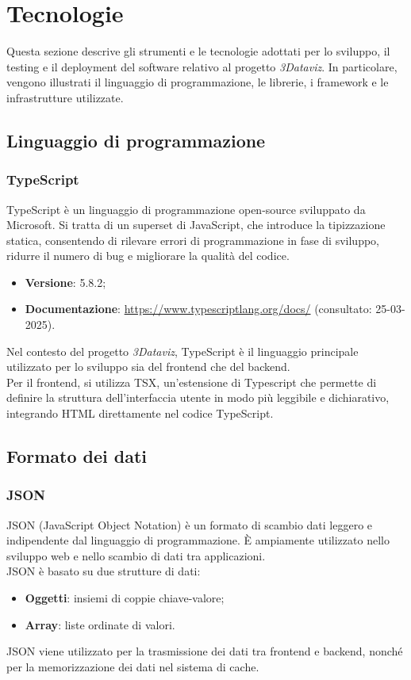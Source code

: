 \section{Tecnologie}
Questa sezione descrive gli strumenti e le tecnologie adottati per lo sviluppo,
il testing e il deployment del software relativo al progetto \textit{3Dataviz}.
In particolare, vengono illustrati il linguaggio di programmazione, le
librerie, i framework e le infrastrutture utilizzate.

\subsection{Linguaggio di programmazione}
\subsubsection{TypeScript}
TypeScript è un linguaggio di programmazione open-source sviluppato da
Microsoft. Si tratta di un superset di JavaScript, che introduce la
tipizzazione statica, consentendo di rilevare errori di programmazione in fase
di sviluppo, ridurre il numero di bug e migliorare la qualità del codice.
\begin{itemize}
    \item \textbf{Versione}: 5.8.2;
    \item \textbf{Documentazione}: \url{https://www.typescriptlang.org/docs/} (consultato:
          25-03-2025).
\end{itemize}
Nel contesto del progetto \textit{3Dataviz}, TypeScript è il linguaggio principale
utilizzato per lo sviluppo sia del frontend che del backend. \\Per il frontend,
si utilizza TSX, un'estensione di Typescript che permette di definire la struttura
dell'interfaccia utente in modo più leggibile e dichiarativo, integrando HTML
direttamente nel codice TypeScript.

\subsection{Formato dei dati}
\subsubsection{JSON}
JSON (JavaScript Object Notation) è un formato di scambio dati leggero e
indipendente dal linguaggio di programmazione. È ampiamente utilizzato nello
sviluppo web e nello scambio di dati tra applicazioni. \\JSON è basato su due
strutture di dati:
\begin{itemize}
    \item \textbf{Oggetti}: insiemi di coppie chiave-valore;
    \item \textbf{Array}: liste ordinate di valori.
\end{itemize}
JSON viene utilizzato per la trasmissione dei dati tra frontend e backend, nonché
per la memorizzazione dei dati nel sistema di cache.

